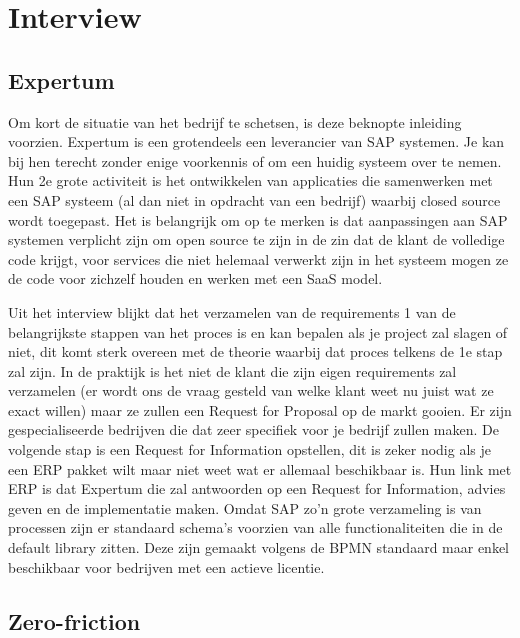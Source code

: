
\chapter{Interview}
\label{ch:interview}

\section{Expertum}

Om kort de situatie van het bedrijf te schetsen, is deze beknopte inleiding voorzien. Expertum is een grotendeels een leverancier van SAP systemen. Je kan bij hen terecht zonder enige voorkennis of om een huidig systeem over te nemen. Hun 2e grote activiteit is het ontwikkelen van applicaties die samenwerken met een SAP systeem (al dan niet in opdracht van een bedrijf) waarbij closed source wordt toegepast. Het is belangrijk om op te merken is dat aanpassingen aan SAP systemen verplicht zijn om open source te zijn in de zin dat de klant de volledige code krijgt, voor services die niet helemaal verwerkt zijn in het systeem mogen ze de code voor zichzelf houden en werken met een SaaS model.

Uit het interview blijkt dat het verzamelen van de requirements 1 van de belangrijkste stappen van het proces is en kan bepalen als je project zal slagen of niet, dit komt sterk overeen met de theorie waarbij dat proces telkens de 1e stap zal zijn. In de praktijk is het niet de klant die zijn eigen requirements zal verzamelen (er wordt ons de vraag gesteld van welke klant weet nu juist wat ze exact willen) maar ze zullen een Request for Proposal op de markt gooien. Er zijn gespecialiseerde bedrijven die dat zeer specifiek voor je bedrijf zullen maken. De volgende stap is een Request for Information opstellen, dit is zeker nodig als je een ERP pakket wilt maar niet weet wat er allemaal beschikbaar is. Hun link met ERP is dat Expertum die zal antwoorden op een Request for Information, advies geven en de implementatie maken. Omdat SAP zo'n grote verzameling is van processen zijn er standaard schema's voorzien van alle functionaliteiten die in de default library zitten. Deze zijn gemaakt volgens de BPMN standaard maar enkel beschikbaar voor bedrijven met een actieve licentie. 

\section{Zero-friction}